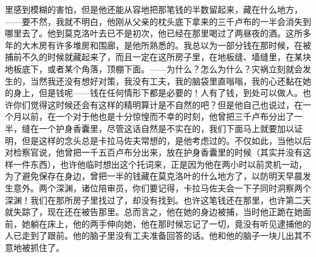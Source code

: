 里感到模糊的害怕，但是他还能从容地把那笔钱的半数留起来，藏在什么地方，——要不然，我就不明白，他刚从父亲的枕头底下拿来的三千卢布的一半会消失到哪里去了。他到莫克洛叶去已不是初次，他已经在那里喝过了两昼夜的酒。这所多年的大木房有许多堆房和围廊，是他所熟悉的。我总以为一部分钱在那时候，在被捕前不久的时候就藏起来了，而且一定在这所房子里，在地板缝、墙缝里，在某块地板底下，或者某个角落，顶棚下面。——为什么？怎么为什么？灾祸立刻就会发生的，当然我还没有想好对策，我没有工夫，我的脑袋里直嗡嗡，我的心还黏在她的身上，但是钱呢——钱在任何情形下都是必要的！人有了钱，到处可以做人。也许你们觉得这时候还会有这样的精明算计是不自然的吧？但是他自己也说过，在一个月以前，在一个对于他也是十分惊惶而不幸的时刻，他曾把三千卢布分出了一半，缝在一个护身香囊里，尽管这话自然是不实在的，我们下面马上就要加以证明，但是这样的念头总是卡拉马佐夫常想的，是他考虑过的。不仅如此，当他以后对检察官说，他曾把一千五百卢布分出来，放在护身香囊里的时候（其实并没有这样一件东西），也许他临时想出这个托词来，正是因为他在两小时以前灵机一动，为了避免保存在身边，曾把一半的钱藏在莫克洛叶的什么地方了，以防明天早晨发生意外。两个深渊，诸位陪审员，你们要记得，卡拉马佐夫会一下子同时洞察两个深渊！我们在那所房子里找过了，却没有找到。也许这笔钱还在那里，也许第二天就失踪了，现在还在被告那里。总而言之，他在她的身边被捕，当时他正跪在她面前，她躺在床上，他的两手伸向她，他在那时候忘记了一切，竟没有听见逮捕他的人已走到了跟前。他的脑子里没有工夫准备回答的话。他和他的脑子一块儿出其不意地被抓住了。
